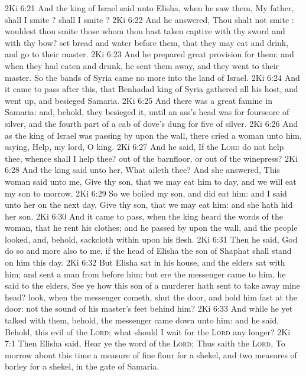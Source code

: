 \vs 2Ki 6:21 And the king of Israel said unto Elisha, when he saw them, My father, shall I smite ? shall I smite ?
\vs 2Ki 6:22 And he answered, Thou shalt not smite : wouldest thou smite those whom thou hast taken captive with thy sword and with thy bow? set bread and water before them, that they may eat and drink, and go to their master.
\vs 2Ki 6:23 And he prepared great provision for them: and when they had eaten and drunk, he sent them away, and they went to their master. So the bands of Syria came no more into the land of Israel.
\vs 2Ki 6:24 And it came to pass after this, that Benhadad king of Syria gathered all his host, and went up, and besieged Samaria.
\vs 2Ki 6:25 And there was a great famine in Samaria: and, behold, they besieged it, until an ass's head was  for fourscore  of silver, and the fourth part of a cab of dove's dung for five  of silver.
\vs 2Ki 6:26 And as the king of Israel was passing by upon the wall, there cried a woman unto him, saying, Help, my lord, O king.
\vs 2Ki 6:27 And he said, If the \textsc{Lord} do not help thee, whence shall I help thee? out of the barnfloor, or out of the winepress?
\vs 2Ki 6:28 And the king said unto her, What aileth thee? And she answered, This woman said unto me, Give thy son, that we may eat him to day, and we will eat my son to morrow.
\vs 2Ki 6:29 So we boiled my son, and did eat him: and I said unto her on the next day, Give thy son, that we may eat him: and she hath hid her son.
\vs 2Ki 6:30 And it came to pass, when the king heard the words of the woman, that he rent his clothes; and he passed by upon the wall, and the people looked, and, behold,  sackcloth within upon his flesh.
\vs 2Ki 6:31 Then he said, God do so and more also to me, if the head of Elisha the son of Shaphat shall stand on him this day.
\vs 2Ki 6:32 But Elisha sat in his house, and the elders sat with him; and  sent a man from before him: but ere the messenger came to him, he said to the elders, See ye how this son of a murderer hath sent to take away mine head? look, when the messenger cometh, shut the door, and hold him fast at the door:  not the sound of his master's feet behind him?
\vs 2Ki 6:33 And while he yet talked with them, behold, the messenger came down unto him: and he said, Behold, this evil  of the \textsc{Lord}; what should I wait for the \textsc{Lord} any longer?
\vs 2Ki 7:1 Then Elisha said, Hear ye the word of the \textsc{Lord}; Thus saith the \textsc{Lord}, To morrow about this time  a measure of fine flour  for a shekel, and two measures of barley for a shekel, in the gate of Samaria.
